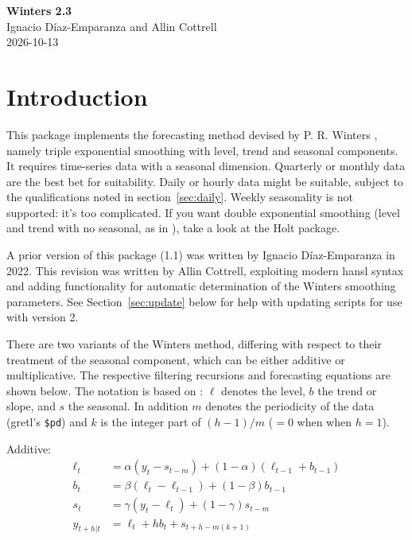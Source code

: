 \documentclass{article}
\begin{document}
\begin{center}
  {\Large \textbf{Winters 2.3}} \\[6pt]
  Ignacio Díaz-Emparanza and Allin Cottrell \\[6pt]
  2026-10-13
\end{center}

\section{Introduction}
\label{sec:intro}

This package implements the forecasting method devised by P. R. Winters
\citeyearpar{winters60}, namely triple exponential smoothing with level,
trend and seasonal components.  It requires time-series data with a
seasonal dimension. Quarterly or monthly data are the best bet for
suitability. Daily or hourly data might be suitable, subject to the
qualifications noted in section~\ref{sec:daily}. Weekly seasonality is
not supported: it's too complicated. If you want double exponential
smoothing (level and trend with no seasonal, as in \citealt{holt57}),
take a look at the \textsf{Holt} package.

A prior version of this package (1.1) was written by Ignacio
Díaz-Emparanza in 2022. This revision was written by Allin Cottrell,
exploiting modern hansl syntax and adding functionality for automatic
determination of the Winters smoothing parameters. See
Section~\ref{sec:update} below for help with updating scripts for use
with version 2.

There are two variants of the Winters method, differing with respect
to their treatment of the seasonal component, which can be either
additive or multiplicative. The respective filtering recursions and
forecasting equations are shown below. The notation is based on
\cite{hyndman2021}: $\ell$ denotes the level, $b$ the trend or slope,
and $s$ the seasonal.  In addition $m$ denotes the periodicity of the
data (gretl's \verb|$pd|) and $k$ is the integer part of
$(h-1)/m$ ($=0$ when when $h=1$).

Additive:
\begin{align*}
  \ell_t &= \alpha (y_t - s_{t-m}) + (1-\alpha) (\ell_{t-1} + b_{t-1})\\
  b_t &= \beta (\ell_t - \ell_{t-1}) + (1-\beta) b_{t-1}\\
  s_t &= \gamma (y_t - \ell_t) + (1-\gamma) s_{t-m}\\
  \hat{y}_{t+h|t} &= \ell_t + hb_t + s_{t+h-m(k+1)}
\end{align*}
\end{document}
